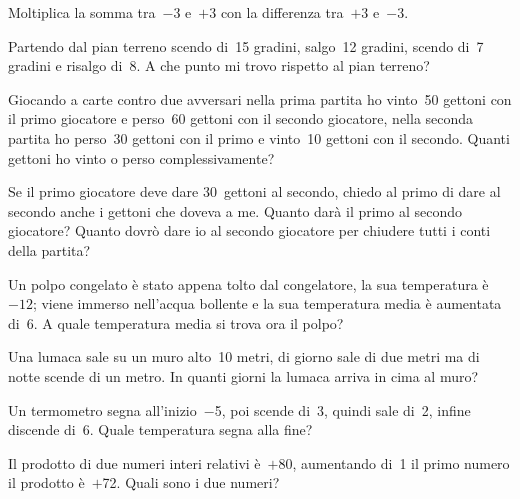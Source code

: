 \begin{multicols}{2}
\begin{esercizio}
 Moltiplica la somma tra~$-3$ e~$+3$ con la differenza tra~$+3$ e~$-3$.
\end{esercizio}

\begin{esercizio}
 Partendo dal pian terreno scendo di~15 gradini, salgo~12 gradini, scendo di~7
gradini e risalgo di~8. A che punto mi trovo rispetto al pian terreno?
\end{esercizio}

\begin{esercizio}[\Ast]
 Giocando a carte contro due avversari nella prima partita ho vinto~50 gettoni con il primo giocatore e perso~60
gettoni con il secondo giocatore, nella seconda partita ho perso~30 gettoni con il primo e vinto~10 gettoni
con il secondo. Quanti gettoni ho vinto o perso complessivamente?

Se il primo giocatore deve dare 30~gettoni al secondo, chiedo al primo di dare al secondo anche i gettoni che doveva a me. Quanto darà il primo al secondo giocatore? Quanto dovrò dare io al secondo giocatore per chiudere tutti i conti della partita?
\end{esercizio}

\begin{esercizio}[\Ast]
 Un polpo congelato è stato appena tolto dal congelatore, la sua temperatura è~$-12$\textdegree;
viene immerso nell'acqua bollente e la sua temperatura media è aumentata di~6\textdegree.
A quale temperatura media si trova ora il polpo?
\end{esercizio}

\begin{esercizio}
 Una lumaca sale su un muro alto~10 metri, di giorno sale di due metri ma di notte
scende di un metro. In quanti giorni la lumaca arriva in cima al muro?
\end{esercizio}

\begin{esercizio}[\Ast]
 Un termometro segna all'inizio~$-$5\textdegree, poi scende di~3\textdegree, quindi sale di~2\textdegree,
infine discende di~6\textdegree. Quale temperatura segna alla fine?
\end{esercizio}

\begin{esercizio}[\Ast]
 Il prodotto di due numeri interi relativi è~$+$80, aumentando di~1 il primo numero il
prodotto è~$+$72. Quali sono i due numeri?									
\end{esercizio}


\end{multicols}
